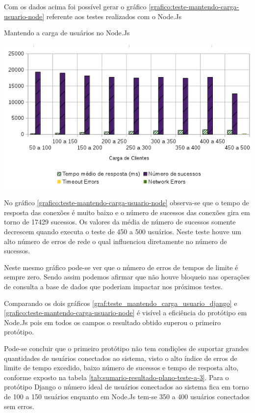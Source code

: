   Com os dados acima foi possível gerar o gráfico \ref{grafico:teste-mantendo-carga-usuario-node} referente aos testes
  realizados com o Node.Js

  \begin{grafico}[H]
    \setlength{\abovecaptionskip}{5pt}
    \setlength{\belowcaptionskip}{0pt}

    \caption[Mantendo a carga de usuários no Node.Js]
	    {Mantendo a carga de usuários no Node.Js}
    \centering
    \includegraphics[width=.80\textwidth]{imagem/graficos/grafico_node_plano_de_teste_3.png}
    \captionsetup[grafico]{justification=centering}
    \label{grafico:teste-mantendo-carga-usuario-node}
  \end{grafico}

  No gráfico \ref{grafico:teste-mantendo-carga-usuario-node}  observa-se que o tempo de resposta das conexões
  é muito baixo e o número de sucessos das conexões gira em torno de 17429 sucessos. Os valores da média de
  número de sucessos somente decrescem quando executa o teste de 450 a 500 usuários. Neste teste houve um alto número de erros
  de rede o qual influenciou diretamente no número de sucessos.

  Neste mesmo gráfico pode-se ver que o número de erros de tempos de limite é sempre zero. Sendo assim podemos afirmar
  que não houve bloqueio nas operações de consulta a base de dados que poderiam impactar nos próximos testes.

  Comparando os dois gráficos \ref{graf:teste_mantendo_carga_usuario_django} e \ref{grafico:teste-mantendo-carga-usuario-node} é
  visível a eficiência do protótipo em Node.Js pois em todos os campos o resultado obtido superou o primeiro protótipo.

  Pode-se concluir que o primeiro protótipo não tem condições de suportar grandes quantidades de usuários conectados ao
  sistema, visto o alto índice de erros de limite de tempo excedido, baixo número de sucessos e tempo de resposta alto,
  conforme exposto na tabela \ref{tab:sumario-resultado-plano-teste-a-3}. Para o protótipo Django o número ideal de usuários
  conectados ao sistema fica em torno de 100 a 150 usuários enquanto em Node.Js tem-se 350 a 400 usuários conectados sem
  erros.

